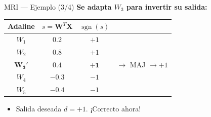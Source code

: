 \documentclass[aspectratio=169,utf8,spanish]{beamer}
\DeclareMathOperator{\sgn}{sgn}
\begin{document}
\begin{frame}{MRI — Ejemplo (3/4)}
  \textbf{Se adapta $W_3$ para invertir su salida:}
  \begin{center}
    \begin{tabular}{c|c|c|c}
      Adaline & $s = \mathbf{W}^T\mathbf{X}$ & $\sgn(s)$ & \\
      \hline
      $W_1$ & $0.2$ & $+1$ & \\
      $W_2$ & $0.8$ & $+1$ & \\
      $\mathbf{W_3'}$ & $\mathbf{0.4}$ & $\mathbf{+1}$ & $\to$ MAJ $\to +1$ \\
      $W_4$ & $-0.3$ & $-1$ & \\
      $W_5$ & $-0.4$ & $-1$ & \\
    \end{tabular}
  \end{center}
  \begin{itemize}
    \item Salida deseada $d = +1$. ¡Correcto ahora!
  \end{itemize}
\end{frame}
\end{document}
